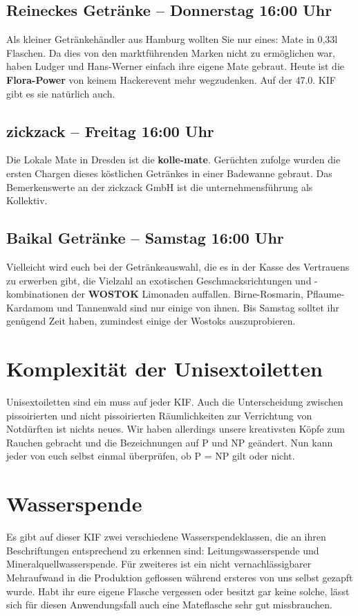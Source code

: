 \subsection*{Reineckes Getränke -- Donnerstag 16:00 Uhr}
Als kleiner Getränkehändler aus Hamburg wollten Sie nur eines: Mate in 0,33l Flaschen.
Da dies von den marktführenden Marken nicht zu ermöglichen war, haben Ludger und Hans-Werner einfach ihre eigene Mate gebraut.
Heute ist die \textbf{Flora-Power} von keinem Hackerevent mehr wegzudenken.
Auf der 47.0. KIF gibt es sie natürlich auch.

\subsection*{zickzack -- Freitag 16:00 Uhr}
Die Lokale Mate in Dresden ist die \textbf{kolle-mate}.
Gerüchten zufolge wurden die ersten Chargen dieses köstlichen Getränkes in einer Badewanne gebraut.
Das Bemerkenswerte an der zickzack GmbH ist die unternehmensführung als Kollektiv.

\subsection*{Baikal Getränke -- Samstag 16:00 Uhr}
Vielleicht wird euch bei der Getränkeauswahl, die es in der Kasse des Vertrauens zu erwerben gibt, die Vielzahl an exotischen Geschmacksrichtungen und -kombinationen der \textbf{WOSTOK} Limonaden auffallen.
Birne-Rosmarin, Pflaume-Kardamom und Tannenwald sind nur einige von ihnen.
Bis Samstag solltet ihr genügend Zeit haben, zumindest einige der Wostoks auszuprobieren.

\section*{Komplexität der Unisextoiletten}
Unisextoiletten sind ein muss auf jeder KIF. Auch die Unterscheidung zwischen pissoirierten und nicht pissoirierten Räumlichkeiten zur Verrichtung von Notdürften ist nichts neues.
Wir haben allerdings unsere kreativsten Köpfe zum Rauchen gebracht und die Bezeichnungen auf P und NP geändert.
Nun kann jeder von euch selbst einmal überprüfen, ob P = NP gilt oder nicht.

\section*{Wasserspende}
Es gibt auf dieser KIF zwei verschiedene Wasserspendeklassen, die an ihren Beschriftungen entsprechend zu erkennen sind: Leitungswasserspende und Mineralquellwasserspende.
Für zweiteres ist ein nicht vernachlässigbarer Mehraufwand in die Produktion geflossen während ersteres von uns selbst gezapft wurde.
Habt ihr eure eigene Flasche vergessen oder besitzt gar keine solche, lässt sich für diesen Anwendungsfall auch eine Mateflasche sehr gut missbrauchen.


